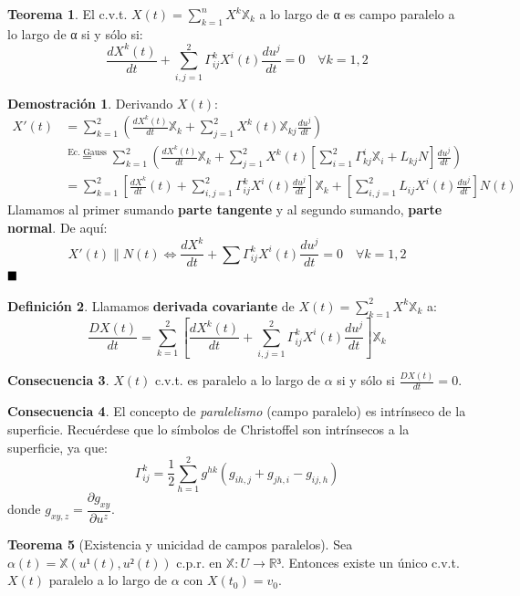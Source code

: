\documentclass[twoside]{report}
\theoremstyle{definition}
\newtheorem{theorem}{Teorema}[section]
\newtheorem{consecuencia}[theorem]{Consecuencia}
\newtheorem{defi}[theorem]{Definición}
\newtheorem*{dem}{Demostración}
\newcommand*{\QED}{\hfill\ensuremath{\blacksquare}}
\numberwithin{equation}{section}
\newcommand{\R}{\mathbb{R}}
\newcommand{\X}{\mathbb{X}}
\begin{document}
\begin{theorem}
El c.v.t. $X(t)=\sum_{k=1}^n X^k \X_k$ a lo largo de α es campo paralelo a lo largo de α si y sólo si:
\[ \frac{dX^k(t)}{dt} + \sum_{i,j=1}^2 Γ_{ij}^k X^i(t) \frac{du^j}{dt} = 0 \quad \forall k=1,2 \]
\end{theorem}
\begin{dem}
Derivando $X(t)$:
\begin{align*} X'(t) & = \sum_{k=1}^2 \left(\frac{dX^k(t)}{dt}\X_k + \sum_{j=1}^2 X^k(t)\X_{kj}\frac{du^j}{dt}\right) \\
 & \overset{\text{Ec. Gauss}}{=} \sum_{k=1}^2 \left(\frac{dX^k(t)}{dt}\X_k + \sum_{j=1}^2 X^k(t)\left[\sum_{i=1}^2 Γ_{kj}^i \X_i + L_{kj}N\right]\frac{du^j}{dt}\right) \\
 & = \sum_{k=1}^2 \left[ \frac{dX^k}{dt}(t) + \sum_{i,j=1}^2 Γ_{ij}^k X^i(t) \frac{du^j}{dt}\right]\X_k + \left[\sum_{i,j=1}^2 L_{ij} X^i(t) \frac{du^j}{dt}\right]N(t)
\end{align*}
Llamamos al primer sumando \textbf{parte  tangente} y al segundo sumando, \textbf{parte normal}. De aquí:
\[ X'(t) \parallel N(t) \Leftrightarrow \frac{dX^k}{dt} + \sum Γ_{ij}^k X^i(t) \frac{du^j}{dt} = 0\quad \forall k=1,2\]
$\QED$
\end{dem}

\begin{defi}
Llamamos \textbf{derivada covariante} de $X(t) = \sum_{k=1}^2 X^k \X_k$ a:
\[ \frac{DX(t)}{dt} = \sum_{k=1}^2 \left[ \frac{dX^k(t)}{dt} + \sum_{i,j=1}^2 Γ_{ij}^k X^i(t) \frac{du^j}{dt}\right]\X_k\]
\end{defi}

\begin{consecuencia}
$X(t)$ c.v.t. es paralelo a lo largo de $α$ si y sólo si $\frac{DX(t)}{dt} = 0$.
\end{consecuencia}

\begin{consecuencia}
El concepto de \emph{paralelismo} (campo paralelo) es intrínseco de la superficie. Recuérdese que lo símbolos de Christoffel son intrínsecos a la superficie, ya que:
\[ Γ_{ij}^k = \frac{1}{2} \sum_{h=1}^2 g^{hk} (g_{ih,j}+g_{jh,i}-g_{ij,h}) \]
donde $g_{xy,z} = \dfrac{\partial g_{xy}}{\partial u^z}$.
\end{consecuencia}

\begin{theorem}[Existencia y unicidad de campos paralelos]
Sea $α(t) = \X(u¹(t), u²(t))$ c.p.r. en $\X : U \to \R³$. Entonces existe un único c.v.t. $X(t)$ paralelo a lo largo de $α$ con $X(t_0)=v_0$.
\end{theorem}
\end{document}
